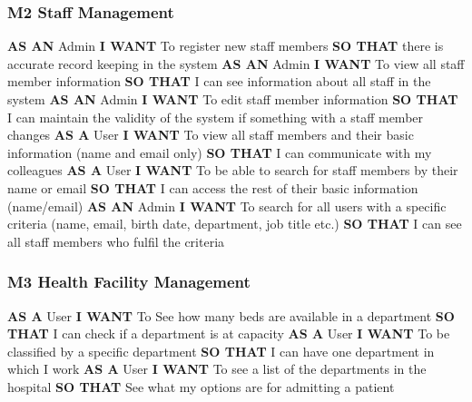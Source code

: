 \subsubsection*{M2 Staff Management}
%
\textbf{AS AN} Admin\hfill \break
\textbf{I WANT} To register new staff members\hfill \break
\textbf{SO THAT} there is accurate record keeping in the system\hfill \medbreak
%
\textbf{AS AN} Admin\hfill \break
\textbf{I WANT} To view all staff member information\hfill \break
\textbf{SO THAT} I can see information about all staff in the system\hfill \medbreak
%
\textbf{AS AN} Admin\hfill \break
\textbf{I WANT} To edit staff member information\hfill \break
\textbf{SO THAT} I can maintain the validity of the system if something with a staff member changes\hfill \medbreak
%
\textbf{AS A} User\hfill \break
\textbf{I WANT} To view all staff members and their basic information (name and email only)\hfill \break
\textbf{SO THAT} I can communicate with my colleagues\hfill \medbreak
%
\textbf{AS A} User\hfill \break
\textbf{I WANT} To be able to search for staff members by their name or email\hfill \break
\textbf{SO THAT} I can access the rest of their basic information (name/email)\hfill \medbreak
%
\textbf{AS AN} Admin\hfill \break
\textbf{I WANT} To search for all users with a specific criteria (name, email, birth date, department, job title etc.)\hfill \break
\textbf{SO THAT} I can see all staff members who fulfil the criteria\hfill \medbreak
%
\subsubsection*{M3 Health Facility Management}
%
\textbf{AS A} User\hfill \break
\textbf{I WANT} To See how many beds are available in a department\hfill \break
\textbf {SO THAT} I can check if a department is at capacity\hfill \medbreak
%
\textbf{AS A} User\hfill \break
\textbf{I WANT} To be classified by a specific department\hfill \break
\textbf {SO THAT} I can have one department in which I work\hfill \medbreak
%
\textbf{AS A} User\hfill \break
\textbf{I WANT} To see a list of the departments in the hospital\hfill \break
\textbf {SO THAT} See what my options are for admitting a patient\hfill \medbreak
%
